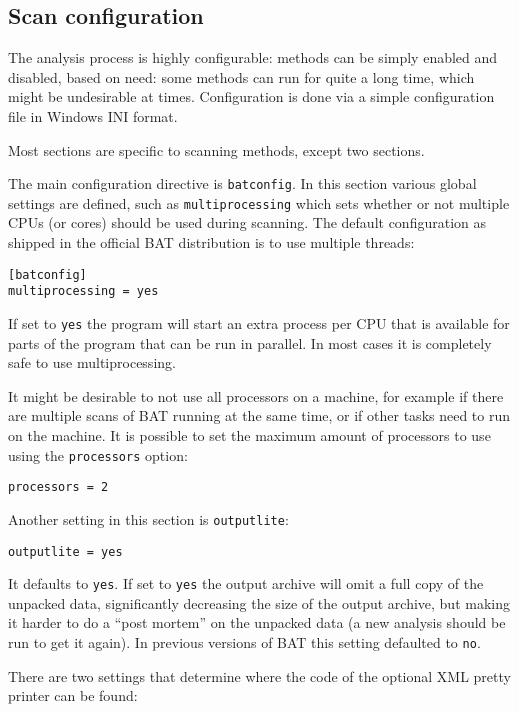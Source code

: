 \documentclass[10pt]{article}
\begin{document}
\subsection{Scan configuration}

The analysis process is highly configurable: methods can be simply enabled and
disabled, based on need: some methods can run for quite a long time, which
might be undesirable at times. Configuration is done via a simple configuration
file in Windows INI format.

Most sections are specific to scanning methods, except two sections.

The main configuration directive is \texttt{batconfig}. In this
section various global settings are defined, such as \texttt{multiprocessing}
which sets whether or not multiple CPUs (or cores) should be used during
scanning. The default configuration as shipped in the official BAT distribution
is to use multiple threads:

\begin{verbatim}
[batconfig]
multiprocessing = yes
\end{verbatim}

If set to \texttt{yes} the program will start an extra process per CPU that is
available for parts of the program that can be run in parallel. In most cases
it is completely safe to use multiprocessing.

It might be desirable to not use all processors on a machine, for example if
there are multiple scans of BAT running at the same time, or if other tasks
need to run on the machine. It is possible to set the maximum amount of
processors to use using the \texttt{processors} option:

\begin{verbatim}
processors = 2
\end{verbatim}

Another setting in this section is \texttt{outputlite}:

\begin{verbatim}
outputlite = yes
\end{verbatim}

It defaults to \texttt{yes}. If set to \texttt{yes} the output archive will omit
a full copy of the unpacked data, significantly decreasing the size of the
output archive, but making it harder to do a ``post mortem'' on the unpacked
data (a new analysis should be run to get it again). In previous versions of BAT
this setting defaulted to \texttt{no}.

There are two settings that determine where the code of the optional XML pretty
printer can be found:
\end{document}
